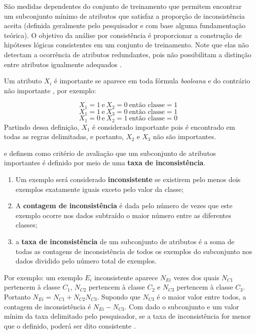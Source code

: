 \documentclass[
]{book}
\begin{document}
São medidas dependentes do conjunto de treinamento que permitem encontrar um subconjunto mínimo de atributos que satisfaz a proporção de inconsistência aceita (definida geralmente pelo pesquisador e com base alguma fundamentação teórica). O objetivo da análise por consistência é proporcionar a construção de hipóteses lógicas consistentes em um conjunto de treinamento. Note que elas não detectam a ocorrência de atributos redundantes, pois não possibilitam a distinção entre atributos igualmente adequados \citep{parmezan2012avaliaccao}.

Um atributo \(X_i\) é importante se aparece em toda fórmula \emph{booleana} e do contrário não importante \citep{almuallim1994learning, lee2005seleccao}, por exemplo:

\[X_1=1 \ \mbox{e} \ X_2=0 \ \mbox{então classe}=1\]
\[X_1=1 \ \mbox{e} \ X_3=0 \ \mbox{então classe}=1\]
\[X_1=0 \ \mbox{e} \ X_2=1 \ \mbox{então classe}=0\]
Partindo dessa definição, \(X_1\) é considerado importante pois é encontrado em todas as regras delimitadas, e portanto, \(X_2\) e \(X_3\) não são importantes.

\citet{dash2003consistency} e \citet{liu1996probabilistic} definem como critério de avaliação que um subconjunto de atributos importantes é definido por meio de uma \textbf{taxa de inconsistência}.

\begin{enumerate}
\def\labelenumi{\arabic{enumi}.}
\item
  Um exemplo será considerado \textbf{inconsistente} se existirem pelo menos dois exemplos exatamente iguais exceto pelo valor da classe;
\item
  A \textbf{contagem de inconsistência} é dada pelo número de vezes que este exemplo ocorre nos dados subtraído o maior número entre as diferentes classes;
\item
  a \textbf{taxa de inconsistência} de um subconjunto de atributos é a soma de todas as contagens de inconsistência de todos os exemplos do subconjunto nos dados dividido pelo número total de exemplos.
\end{enumerate}

Por exemplo: um exemplo \(E_i\) inconsistente aparece \(N_{Ei}\) vezes dos quais \(N_{C1}\) pertencem à classe \(C_1\), \(N_{C2}\) pertencem à classe \(C_2\) e \(N_{C3}\) pertencem à classe \(C_3\). Portanto \(N_{Ei}=N_{C1}+N_{C2}N_{C3}\). Supondo que \(N_{C3}\) é o maior valor entre todos, a contagem de inconsistência é \(N_{Ei}-N_{C3}\). Com dado o subconjunto e um valor mínim da taxa delimitado pelo pesquisador, se a taxa de inconsistência for menor que o definido, poderá ser dito consistente \citep{lee2005seleccao}.
\end{document}
